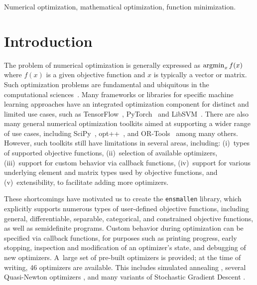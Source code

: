 \documentclass[twoside,11pt]{article}
\begin{document}
\begin{keywords}
  Numerical optimization, mathematical optimization, function minimization.
\end{keywords}


\section{Introduction}

The problem of numerical optimization is generally expressed as
$\operatornamewithlimits{argmin}_x f(x)$
where $f(x)$ is a given objective function and $x$ is typically a vector or matrix.
Such optimization problems are fundamental and ubiquitous in the computational sciences~\citep{Nocedal_2006}.
Many frameworks or libraries for specific machine learning approaches
have an integrated optimization component for distinct and limited use cases,
such as
TensorFlow~\citep{TensorFlow_arXiv_2016},
PyTorch~\citep{PyTorch_NeurIPS_2019}
and LibSVM~\citep{libsvm2011}.
There are also many general numerical optimization toolkits
aimed at supporting a wider range of use cases,
including SciPy~\citep{SciPy_NMeth_2020},
opt++~\citep{meza1994opt++},
and 
OR-Tools~\citep{ortools} among many others.
However, such toolkits still have limitations in several areas,
including:
(i)~types of supported objective functions,
(ii)~selection of available optimizers,
(iii)~support for custom behavior via callback functions,
(iv)~support for various underlying element and matrix types used by objective functions,
and
(v)~extensibility, to facilitate adding more optimizers.

These shortcomings have motivated us to create the {\tt ensmallen} library,
which explicitly supports numerous types of user-defined objective functions,
including general, differentiable, separable, categorical, and constrained
objective functions, as well as semidefinite programs.
Custom behavior during optimization can be specified via {callback} functions,
for purposes such as printing progress, early stopping, inspection and modification of an optimizer's state,
and debugging of new optimizers.
A~large set of pre-built optimizers is provided;
at the time of writing, 46 optimizers are available.
This includes 
simulated annealing \citep{kirkpatrick1983optimization},
several Quasi-Newton optimizers \citep{liu1989limited,mokhtari2018},
and many variants of Stochastic Gradient Descent \citep{Ruder_2016}.
\end{document}
